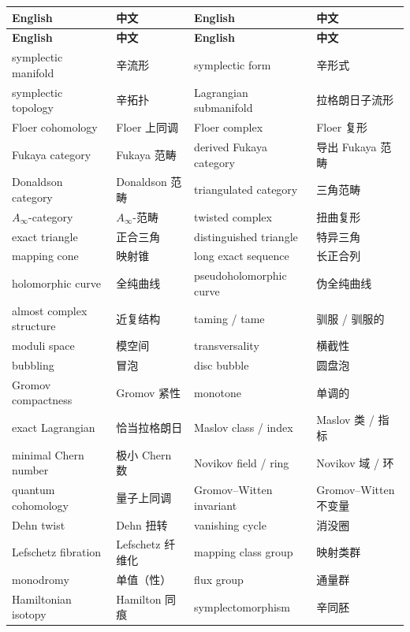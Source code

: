\documentclass[11pt,a4paper]{article}
\numberwithin{equation}{section}
\begin{document}
\begin{center}
\footnotesize
\begin{longtable}{p{}p{}p{}p{}}
\toprule
\textbf{English} & \textbf{中文} & \textbf{English} & \textbf{中文} \\
\midrule
\endfirsthead
\toprule
\textbf{English} & \textbf{中文} & \textbf{English} & \textbf{中文} \\
\midrule
\endhead
\bottomrule
\endfoot
symplectic manifold & 辛流形 & symplectic form & 辛形式 \\
symplectic topology & 辛拓扑 & Lagrangian submanifold & 拉格朗日子流形 \\
Floer cohomology & Floer 上同调 & Floer complex & Floer 复形 \\
Fukaya category & Fukaya 范畴 & derived Fukaya category & 导出 Fukaya 范畴 \\
Donaldson category & Donaldson 范畴 & triangulated category & 三角范畴 \\
$A_\infty$-category & $A_\infty$-范畴 & twisted complex & 扭曲复形 \\
exact triangle & 正合三角 & distinguished triangle & 特异三角 \\
mapping cone & 映射锥 & long exact sequence & 长正合列 \\
holomorphic curve & 全纯曲线 & pseudoholomorphic curve & 伪全纯曲线 \\
almost complex structure & 近复结构 & taming / tame & 驯服 / 驯服的 \\
moduli space & 模空间 & transversality & 横截性 \\
bubbling & 冒泡 & disc bubble & 圆盘泡 \\
Gromov compactness & Gromov 紧性 & monotone & 单调的 \\
exact Lagrangian & 恰当拉格朗日 & Maslov class / index & Maslov 类 / 指标 \\
minimal Chern number & 极小 Chern 数 & Novikov field / ring & Novikov 域 / 环 \\
quantum cohomology & 量子上同调 & Gromov--Witten invariant & Gromov--Witten 不变量 \\
Dehn twist & Dehn 扭转 & vanishing cycle & 消没圈 \\
Lefschetz fibration & Lefschetz 纤维化 & mapping class group & 映射类群 \\
monodromy & 单值（性） & flux group & 通量群 \\
Hamiltonian isotopy & Hamilton 同痕 & symplectomorphism & 辛同胚 \\

\end{longtable}
\end{center}
\end{document}
